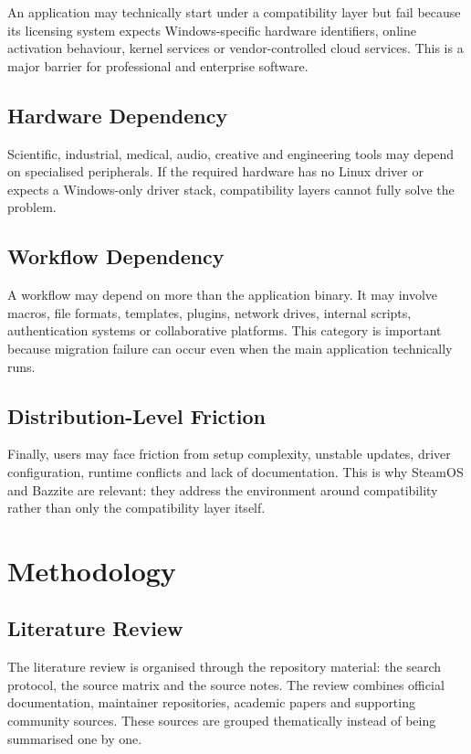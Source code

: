 \documentclass[conference]{IEEEtran}
\begin{document}
An application may technically start under a compatibility layer but fail because its licensing system expects Windows-specific hardware identifiers, online activation behaviour, kernel services or vendor-controlled cloud services. This is a major barrier for professional and enterprise software.

\subsection{Hardware Dependency}

Scientific, industrial, medical, audio, creative and engineering tools may depend on specialised peripherals. If the required hardware has no Linux driver or expects a Windows-only driver stack, compatibility layers cannot fully solve the problem.

\subsection{Workflow Dependency}

A workflow may depend on more than the application binary. It may involve macros, file formats, templates, plugins, network drives, internal scripts, authentication systems or collaborative platforms. This category is important because migration failure can occur even when the main application technically runs.

\subsection{Distribution-Level Friction}

Finally, users may face friction from setup complexity, unstable updates, driver configuration, runtime conflicts and lack of documentation. This is why SteamOS and Bazzite are relevant: they address the environment around compatibility rather than only the compatibility layer itself.

\section{Methodology}

\subsection{Literature Review}

The literature review is organised through the repository material: the search protocol, the source matrix and the source notes. The review combines official documentation, maintainer repositories, academic papers and supporting community sources. These sources are grouped thematically instead of being summarised one by one.
\end{document}
